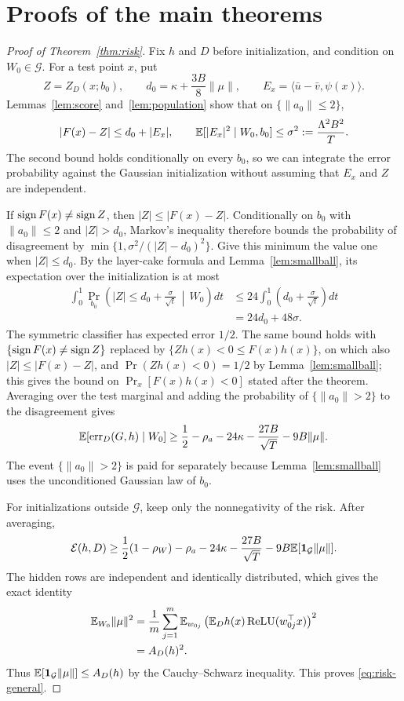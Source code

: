 \documentclass[11pt,letterpaper,pmlr,twoside]{jmlr}
\newcommand{\relu}{\operatorname{ReLU}}\newcommand{\dc}{\operatorname{dc}}
\newcommand{\err}{\operatorname{err}}\newcommand{\Risk}{\mathcal E}
\newcommand{\ind}{\mathbf1}\newcommand{\eps}{\varepsilon}
\newcommand{\ip}[2]{\langle #1,#2\rangle}\newcommand{\norm}[1]{\lVert #1\rVert}
\newcommand{\Gcal}{\mathcal G}\newcommand{\Bfr}{\mathfrak B}
\begin{document}
\section{Proofs of the main theorems}
\label{app:margin}
\begin{proof}[Proof of Theorem~\ref{thm:risk}]
Fix $h$ and $D$ before initialization, and condition on $W_0\in\Gcal$. For a test point $x$, put
\[
 Z=Z_D(x;b_0),\qquad
 d_0=\kappa+\frac{3B}{8}\norm\mu,\qquad
 E_x=\ip{\bar u-\bar v}{\psi(x)}.
\]
Lemmas~\ref{lem:score} and~\ref{lem:population} show that on $\{\norm{a_0}\le2\}$,
\[
 |F(x)-Z|\le d_0+|E_x|,\qquad
 \mathbb E[|E_x|^2\mid W_0,b_0]\le\sigma^2:=\frac{\Lambda^2 B^2}{T}.
\]
The second bound holds conditionally on every $b_0$, so we can integrate the error probability against the Gaussian initialization without assuming that $E_x$ and $Z$ are independent.

If $\operatorname{sign} F(x)\ne\operatorname{sign} Z$, then $|Z|\le|F(x)-Z|$. Conditionally on $b_0$ with $\norm{a_0}\le2$ and $|Z|>d_0$, Markov's inequality therefore bounds the probability of disagreement by $\min\{1,\sigma^2/(|Z|-d_0)^2\}$. Give this minimum the value one when $|Z|\le d_0$. By the layer-cake formula and Lemma~\ref{lem:smallball}, its expectation over the initialization is at most
\begin{align*}
 \int_0^1\Pr_{b_0}\left(|Z|\le d_0+\frac{\sigma}{\sqrt t}\,\middle|\,W_0\right)dt
 &\le24\int_0^1\left(d_0+\frac{\sigma}{\sqrt t}\right)dt\\
 &=24d_0+48\sigma.
\end{align*}
The symmetric classifier has expected error $1/2$. The same bound holds with $\{\operatorname{sign} F(x)\ne\operatorname{sign} Z\}$ replaced by $\{Zh(x)<0\le F(x)h(x)\}$, on which also $|Z|\le|F(x)-Z|$, and $\Pr(Zh(x)<0)=1/2$ by Lemma~\ref{lem:smallball}; this gives the bound on $\Pr_x[F(x)h(x)<0]$ stated after the theorem. Averaging over the test marginal and adding the probability of $\{\norm{a_0}>2\}$ to the disagreement gives
\[
 \E[\err_D(G,h)\mid W_0]
 \ge\frac12-\rho_a-24\kappa-\frac{27B}{\sqrt T}-9B\norm\mu.
\]
The event $\{\norm{a_0}>2\}$ is paid for separately because Lemma~\ref{lem:smallball} uses the unconditioned Gaussian law of $b_0$.

For initializations outside $\Gcal$, keep only the nonnegativity of the risk. After averaging,
\[
 \Risk(h,D)\ge\frac12(1-\rho_W)-\rho_a-24\kappa-\frac{27B}{\sqrt T}
       -9B\E[\ind_{\Gcal}\norm\mu].
\]
The hidden rows are independent and identically distributed, which gives the exact identity
\begin{align}
 \E_{W_0}\norm\mu^2
 &=\frac1m\sum_{j=1}^m\E_{w_{0j}}
       \left(\E_Dh(x)\relu(w_{0j}^\top x)\right)^2\notag\\
 &=A_D(h)^2.
 \label{eq:kernelidentity}
\end{align}
Thus $\E[\ind_{\Gcal}\norm\mu]\le A_D(h)$ by the Cauchy--Schwarz inequality. This proves \eqref{eq:risk-general}.
\end{proof}
\end{document}
